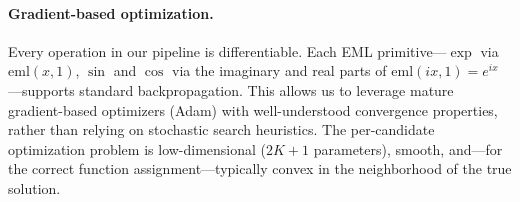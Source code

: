 \paragraph{Gradient-based optimization.}
Every operation in our pipeline is differentiable.  Each EML
primitive---$\exp$ via $\mathrm{eml}(x, 1)$, $\sin$ and $\cos$ via the
imaginary and real parts of $\mathrm{eml}(ix, 1) = e^{ix}$---supports
standard backpropagation.  This allows us to leverage mature gradient-based
optimizers (Adam) with well-understood convergence properties, rather
than relying on stochastic search heuristics.  The per-candidate
optimization problem is low-dimensional ($2K + 1$ parameters), smooth,
and---for the correct function assignment---typically convex in the
neighborhood of the true solution.
